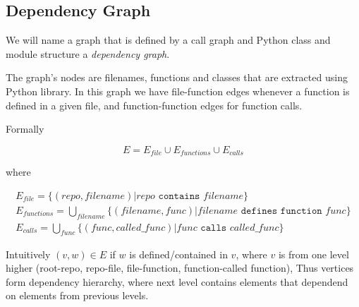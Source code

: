 
\subsection{Dependency Graph}

We will name a graph that is defined by a call graph and Python class and module structure a \emph{dependency graph}.

The graph's nodes are filenames, functions and classes that are extracted using Python  library. In this graph we have file-function edges whenever a function is defined in a given file, and function-function edges for function calls.

Formally

$$E = E_{file} \cup E_{functions} \cup E_{calls}$$

where

\begin{gather*}
E_{file} = \{(repo, filename) | repo \texttt{ contains } filename\} \\
E_{functions} = \bigcup\limits_{filename} \{(filename, func) | filename \texttt{ defines function } func\} \\
E_{calls} = \bigcup\limits_{func} \{(func, called\_func) | func \texttt{ calls } called\_func\}
\end{gather*}

Intuitively $(v, w) \in E$ if $w$ is defined/contained in $v$, where $v$ is from one level higher (root-repo, repo-file, file-function, function-called function), Thus vertices form dependency hierarchy, where next level contains elements that dependend on elements from previous levels.

